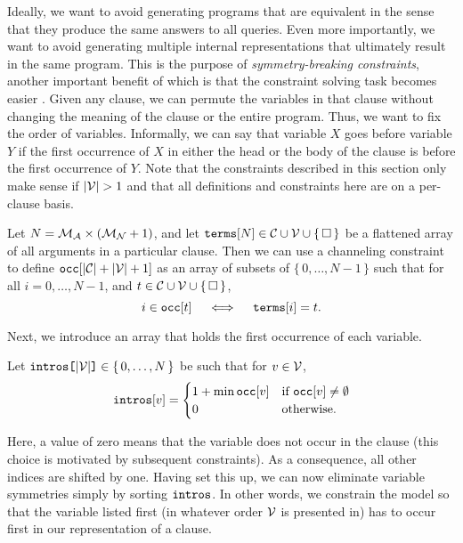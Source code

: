 Ideally, we want to avoid generating programs that are equivalent in the sense
that they produce the same answers to all queries. Even more importantly, we
want to avoid generating multiple internal representations that ultimately
result in the same program. This is the purpose of \emph{symmetry-breaking
  constraints}, another important benefit of which is that the constraint
solving task becomes easier \citep{DBLP:conf/cp/Walsh06}. Given any clause, we
can permute the variables in that clause without changing the meaning of the
clause or the entire program. Thus, we want to fix the order of variables.
Informally, we can say that variable $X$ goes before variable $Y$ if the first
occurrence of $X$ in either the head or the body of the clause is before the
first occurrence of $Y$. Note that the constraints described in this section
only make sense if $|\mathcal{V}{}| > 1$ and that all definitions and constraints
here are on a per-clause basis.
\begin{definition}
  Let $N = \mathcal{M}_{\mathcal{A}}{} \times (\mathcal{M}_{\mathcal{N}}{} + 1)$, and let
  $\texttt{\textup{terms}}[N] \in \mathcal{C}{} \cup \mathcal{V}{} \cup \{\, \Box \,\}$
  be a flattened array of all arguments in a particular clause. Then we can use
  a channeling constraint to define
  $\texttt{\textup{occ}}[|\mathcal{C}{}| + |\mathcal{V}{}| + 1]$ as an array of subsets
  of $\{\, 0, \dots, N-1 \,\}$ such that for all $i = 0, \dots, N - 1$, and
  $t \in \mathcal{C}{} \cup \mathcal{V}{} \cup \{\, \Box \,\}$,
  \[
    i \in \texttt{\textup{occ}}[t] \quad \iff \quad
    \texttt{\textup{terms}}[i] = t.
  \]
\end{definition}
Next, we introduce an array that holds the first occurrence of each variable.
\begin{definition}
  Let $\texttt{\textup{{intros}[}}{|\mathcal{V}{}|}\texttt{\textup{]}} \in {\{\, 0, \dots, N \,\}}$ be such that
  for $v \in \mathcal{V}{}$,
  \[
    \texttt{\textup{intros}}[v] = \begin{cases}
      1 + \min \texttt{\textup{occ}}[v] & \text{if }
      \texttt{\textup{occ}}[v] \ne \emptyset\\
      0 & \text{otherwise.}
    \end{cases}
  \]
\end{definition}
Here, a value of zero means that the variable does not occur in the clause (this
choice is motivated by subsequent constraints). As a consequence, all other
indices are shifted by one. Having set this up, we can now eliminate variable
symmetries simply by sorting $\texttt{\textup{intros}}$. In other words, we constrain
the model so that the variable listed first (in whatever order $\mathcal{V}{}$ is
presented in) has to occur first in our representation of a clause.

